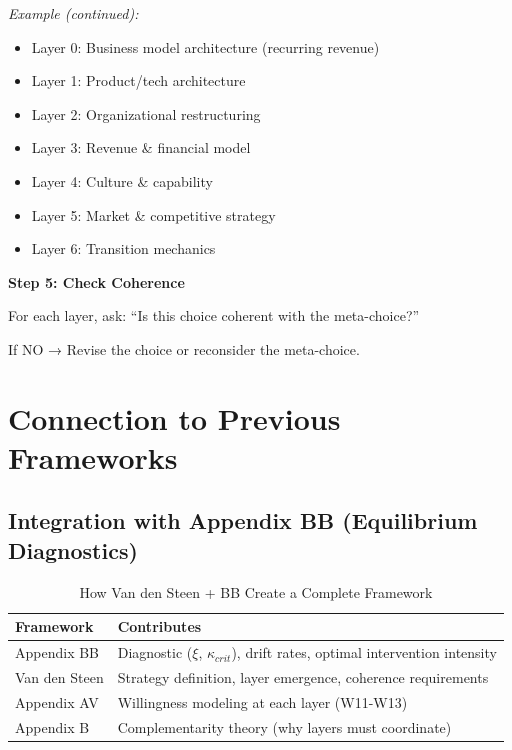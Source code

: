 \documentclass[11pt, a4paper]{article}
\begin{document}
\begin{center}
\textit{Example (continued):}
\begin{itemize}[nosep]
    \item Layer 0: Business model architecture (recurring revenue)
    \item Layer 1: Product/tech architecture
    \item Layer 2: Organizational restructuring
    \item Layer 3: Revenue \& financial model
    \item Layer 4: Culture \& capability
    \item Layer 5: Market \& competitive strategy
    \item Layer 6: Transition mechanics
\end{itemize}
\end{center}

\textbf{Step 5: Check Coherence}

For each layer, ask: ``Is this choice coherent with the meta-choice?''

If NO → Revise the choice or reconsider the meta-choice.

\section{Connection to Previous Frameworks}

\subsection{Integration with Appendix BB (Equilibrium Diagnostics)}

\begin{table}[htbp]
\centering
\caption{How Van den Steen + BB Create a Complete Framework}
\begin{tabular}{|l|p{6cm}|}
\hline
\textbf{Framework} & \textbf{Contributes} \\
\hline
Appendix BB & Diagnostic ($\xi$, $\kappa_{crit}$), drift rates, optimal intervention intensity \\
\hline
Van den Steen & Strategy definition, layer emergence, coherence requirements \\
\hline
Appendix AV & Willingness modeling at each layer (W11-W13) \\
\hline
Appendix B & Complementarity theory (why layers must coordinate) \\
\hline
\end{tabular}
\end{table}
\end{document}
